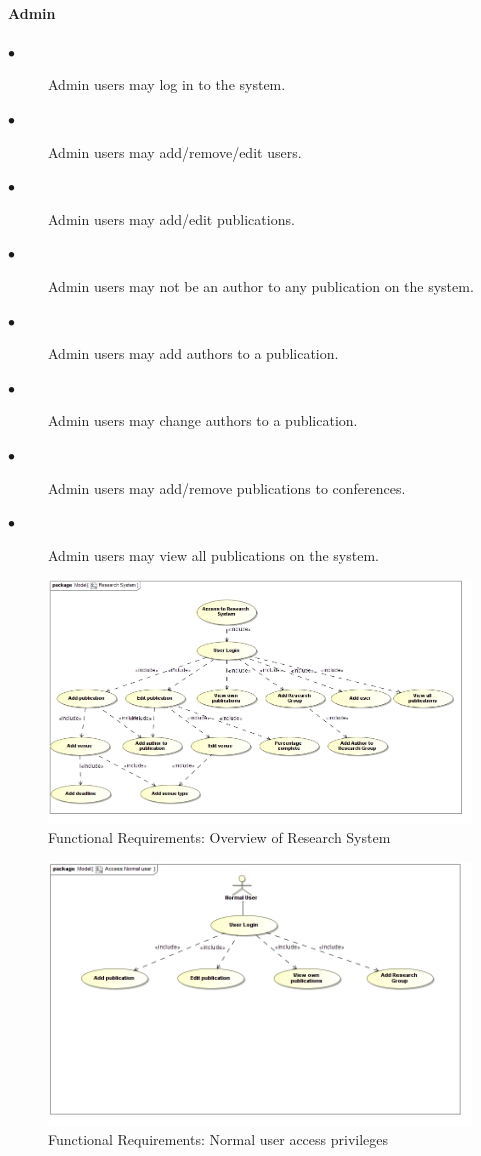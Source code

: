 \documentclass[a4paper]{article}
\begin{document}
	\paragraph{\textbf{Admin}}
	\begin{description}
		\item[$\bullet$] Admin users may log in to the system.
		\item[$\bullet$] Admin users may add/remove/edit users.
		\item[$\bullet$] Admin users may add/edit publications.
		\item[$\bullet$] Admin users may not be an author to any publication on the system.
		\item[$\bullet$] Admin users may add authors to a publication.
		\item[$\bullet$] Admin users may change authors to a publication.
		\item[$\bullet$] Admin users may add/remove publications to conferences.
		\item[$\bullet$] Admin users may view all publications on the system.
	\end{description}
	\begin{figure}[H]
		\includegraphics[width=\textwidth]{../Assignment1/Overview.jpg}
		\caption{Functional Requirements: Overview of Research System \label{overflow}}
	\end{figure}
	\begin{figure}[H]
		\includegraphics[width=\textwidth]{../Assignment1/AccessNormaluser.jpg}
		\caption{Functional Requirements: Normal user access privileges \label{overflow}}
	\end{figure}
\end{document}
